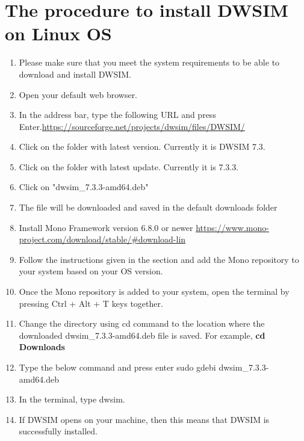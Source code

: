 \documentclass[12pt,a4paper]{article}
\begin{document}
\section{The procedure to install DWSIM on Linux OS}

\begin{enumerate}
\item Please make sure that you meet the system requirements to be able to download and install DWSIM.
\item Open your default web browser.
\item In the address bar, type the following URL and press Enter.\newline \url{https://sourceforge.net/projects/dwsim/files/DWSIM/}

\item Click on the folder with latest version. Currently it is DWSIM 7.3.

\item Click on the folder with latest update. Currently it is 7.3.3.
\item Click on "dwsim\_7.3.3-amd64.deb"
\item The file will be downloaded and saved in the default downloads folder
\item Install Mono Framework version 6.8.0 or newer
\newline \url{https://www.mono-project.com/download/stable/#download-lin}
\item Follow the instructions given in the section and add the Mono repository to your system based on your OS version. 

\item Once the Mono repository is added to your system, open the terminal by pressing Ctrl + Alt + T keys together.

\item Change the directory using cd command to the location where the downloaded dwsim\_7.3.3-amd64.deb file is saved. For example, \textbf{cd Downloads}

\newpage

\item Type the below command and press enter
\newline sudo gdebi dwsim\_7.3.3-amd64.deb

\item In the terminal, type dwsim.
\item If DWSIM opens on your machine, then this means that DWSIM is successfully installed.

\end{enumerate}
\end{document}
